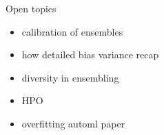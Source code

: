 \documentclass[11pt,compress,t,notes=noshow, aspectratio=169, xcolor=table]{beamer}
\begin{document}

\begin{vbframe}{Open topics}
\begin{itemize}
    \item calibration of ensembles
    \item how detailed bias variance recap
    \item diversity in ensembling
    \item HPO
    \item overfitting automl paper
\end{itemize}
\end{vbframe}



\endlecture
\end{document}
